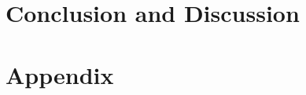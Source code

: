 \section{Conclusion and Discussion}\label{section:opg-conclusion}





\newpage
\section*{Appendix}\label{section:opg-appendix}





